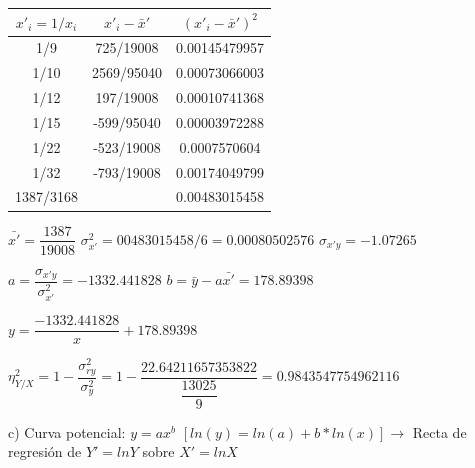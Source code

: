 \documentclass[10pt,a4paper]{article}
\begin{document}
\begin{enumerate}
\vspace{0.25cm}
\begin{tabular}{|c|c|c|}
\hline 
$x'_i = 1/x_i$ & $x'_i - \bar{x}'$ & $(x'_i - \bar{x}')^2$ \\ 
\hline 
1/9 & 725/19008 & 0.00145479957 \\ 
\hline 
1/10 & 2569/95040 & 0.00073066003 \\ 
\hline 
1/12 & 197/19008 & 0.00010741368 \\ 
\hline 
1/15 & -599/95040 & 0.00003972288 \\ 
\hline 
1/22 & -523/19008 & 0.0007570604 \\ 
\hline 
1/32 & -793/19008 & 0.00174049799 \\ 
\hline 
1387/3168 &   & 0.00483015458 \\ 
\hline 
\end{tabular} 

\vspace{0.25cm}
$\bar{x'} = \dfrac{1387}{19008}$ \hspace{2cm} $\sigma_{x'}^2 = 00483015458/6 = 0.00080502576$ \hspace{2cm} $\sigma_{x'y} = -1.07265$

\vspace{0.25cm}
$a = \dfrac{\sigma_{x'y}}{\sigma_{x'}^2} = -1332.441828$ \hspace{2cm} $b = \bar{y} - a \bar{x'} = 178.89398$

\begin{center}
$y = \dfrac{-1332.441828}{x} + 178.89398$
\end{center}

\vspace{0.25cm}
$\eta_{Y / X}^2 = 1 - \dfrac{\sigma_{ry}^2}{\sigma_y^2} = 1 - \dfrac{22.64211657353822}{\dfrac{13025}{9}} = 0.9843547754962116$

\vspace{0.5cm}
\hspace{0.25cm} c) Curva potencial: $y = ax^b$ \hspace{2pt} $[ln(y) = ln(a) + b*ln(x)] \rightarrow$ Recta de regresión de $Y' = ln Y$ sobre $X' = ln X$


\end{enumerate}
\end{document}
